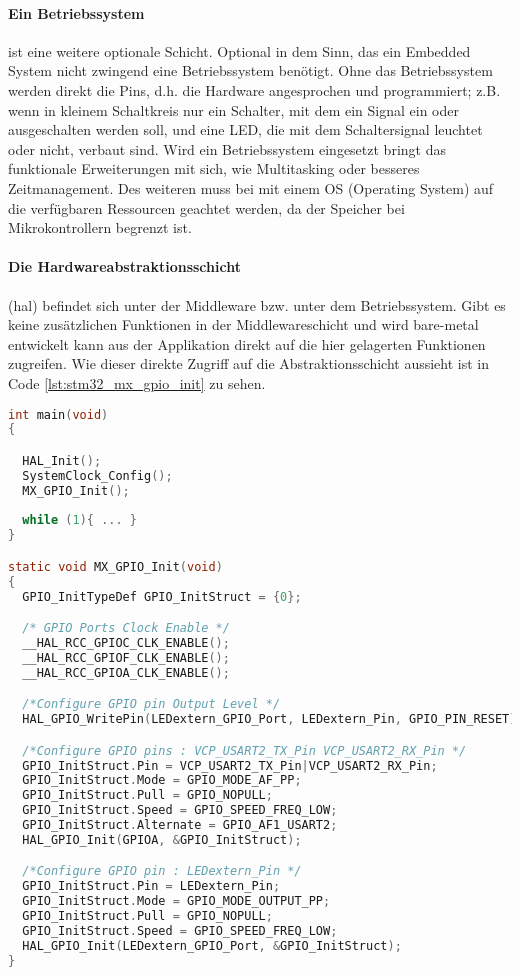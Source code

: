 \paragraph{Ein Betriebssystem} ist eine weitere optionale Schicht.
Optional in dem Sinn, das ein Embedded System nicht zwingend eine Betriebssystem benötigt.
Ohne das Betriebssystem werden direkt die Pins, d.h. die Hardware angesprochen und programmiert; z.B. wenn in kleinem Schaltkreis nur ein Schalter, mit dem ein Signal ein oder ausgeschalten werden soll, und eine LED, die mit dem Schaltersignal leuchtet oder nicht, verbaut sind.
Wird ein Betriebssystem eingesetzt bringt das funktionale Erweiterungen mit sich, wie Multitasking oder besseres Zeitmanagement.
Des weiteren muss bei mit einem OS (Operating System) auf die verfügbaren Ressourcen geachtet werden, da der Speicher bei Mikrokontrollern begrenzt ist.

\paragraph{Die Hardwareabstraktionsschicht} (\gls{hal}) befindet sich unter der Middleware bzw. unter dem Betriebssystem.
Gibt es keine zusätzlichen Funktionen in der Middlewareschicht und wird bare-metal entwickelt kann aus der Applikation direkt auf die hier gelagerten Funktionen zugreifen.
Wie dieser direkte Zugriff auf die Abstraktionsschicht aussieht ist in Code \ref{lst:stm32_mx_gpio_init} %
zu sehen.

\begin{lstlisting}[language=C, caption={Funktion zur Initialisierung der GPIO-Pins aus einem STM32-Projekt.}, label={lst:stm32_mx_gpio_init}]
int main(void)
{

  HAL_Init();
  SystemClock_Config();
  MX_GPIO_Init();
  
  while (1){ ... } 
}

static void MX_GPIO_Init(void)
{
  GPIO_InitTypeDef GPIO_InitStruct = {0};

  /* GPIO Ports Clock Enable */
  __HAL_RCC_GPIOC_CLK_ENABLE();
  __HAL_RCC_GPIOF_CLK_ENABLE();
  __HAL_RCC_GPIOA_CLK_ENABLE();

  /*Configure GPIO pin Output Level */
  HAL_GPIO_WritePin(LEDextern_GPIO_Port, LEDextern_Pin, GPIO_PIN_RESET);

  /*Configure GPIO pins : VCP_USART2_TX_Pin VCP_USART2_RX_Pin */
  GPIO_InitStruct.Pin = VCP_USART2_TX_Pin|VCP_USART2_RX_Pin;
  GPIO_InitStruct.Mode = GPIO_MODE_AF_PP;
  GPIO_InitStruct.Pull = GPIO_NOPULL;
  GPIO_InitStruct.Speed = GPIO_SPEED_FREQ_LOW;
  GPIO_InitStruct.Alternate = GPIO_AF1_USART2;
  HAL_GPIO_Init(GPIOA, &GPIO_InitStruct);

  /*Configure GPIO pin : LEDextern_Pin */
  GPIO_InitStruct.Pin = LEDextern_Pin;
  GPIO_InitStruct.Mode = GPIO_MODE_OUTPUT_PP;
  GPIO_InitStruct.Pull = GPIO_NOPULL;
  GPIO_InitStruct.Speed = GPIO_SPEED_FREQ_LOW;
  HAL_GPIO_Init(LEDextern_GPIO_Port, &GPIO_InitStruct);
}
\end{lstlisting}

